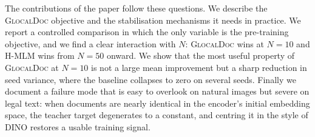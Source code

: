 \documentclass[conference]{IEEEtran}
\newcommand{\glocal}{\textsc{GlocalDoc}}
\newcommand{\hmlm}{\mbox{H-MLM}}
\begin{document}
The contributions of the paper follow these questions. We describe the \glocal{}
objective and the stabilisation mechanisms it needs in practice. We report a
controlled comparison in which the only variable is the pre-training objective, and
we find a clear interaction with $N$: \glocal{} wins at $N=10$ and \hmlm{} wins from
$N=50$ onward. We show that the most useful property of \glocal{} at $N=10$ is not
a large mean improvement but a sharp reduction in seed variance, where the baseline
collapses to zero on several seeds. Finally we document a failure mode that is easy
to overlook on natural images but severe on legal text: when documents are nearly
identical in the encoder's initial embedding space, the teacher target degenerates
to a constant, and centring it in the style of DINO \cite{caron2021emerging}
restores a usable training signal.
\end{document}
